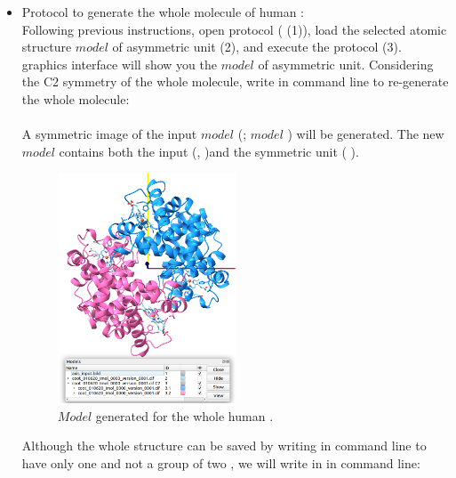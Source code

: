\begin{itemize}

 \item Protocol  to generate the whole molecule of human :\\
 
 Following previous instructions, open \chimera {} protocol ( (1)), load 
 the selected atomic structure $model$ of  asymmetric unit (2), and execute the protocol (3). \chimera graphics interface will show you the $model$ of  asymmetric unit. Considering the C2 symmetry of the whole molecule, write in \chimera command line to re-generate the whole molecule:\\
 
 \\
 
 A symmetric image of the input $model$ (; $model$ ) will be generated. The new $model$  contains both the input (,  )and the symmetric unit ( ). 
 
 \begin{figure}[H]
    \centering 
    \captionsetup{width=.9\linewidth} 
    \includegraphics[width=0.50\textwidth]{Images/Fig41}
    \caption{$Model$ generated for the whole human .}
    \label{fig:chimera_operate_sym}
   \end{figure}
Although the whole structure can be saved by writing in \chimera command line  to have only one  and not a group of two , we will write in in \chimera command line:\\
 

\end{itemize}
